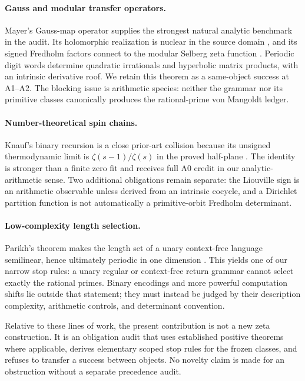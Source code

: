 \paragraph{Gauss and modular transfer operators.}
Mayer's Gauss-map operator supplies the strongest natural analytic benchmark
in the audit.  Its holomorphic realization is nuclear in the source domain
\citep{mayer1990gauss}, and its signed Fredholm factors connect to the modular
Selberg zeta function \citep{mayer1991selberg}.  Periodic digit words determine
quadratic irrationals and hyperbolic matrix products, with an intrinsic
derivative roof.  We retain this theorem as a same-object success at A1--A2.
The blocking issue is arithmetic species: neither the grammar nor its
primitive classes canonically produces the rational-prime von Mangoldt ledger.

\paragraph{Number-theoretical spin chains.}
Knauf's binary recursion is a close prior-art collision because its unsigned
thermodynamic limit is
\(\zeta(s-1)/\zeta(s)\) in the proved half-plane
\citep{knauf2013adelic,knauf1998spin,knauf1999erratum}.  The identity is stronger than a
finite zero fit and receives full A0 credit in our analytic-arithmetic sense.
Two additional obligations remain separate: the Liouville sign is an
arithmetic observable unless derived from an intrinsic cocycle, and a
Dirichlet partition function is not automatically a primitive-orbit Fredholm
determinant.

\paragraph{Low-complexity length selection.}
Parikh's theorem makes the length set of a unary context-free language
semilinear, hence ultimately periodic in one dimension
\citep{esparza2011parikh}.  This yields one of our narrow stop rules: a unary
regular or context-free return grammar cannot select exactly the rational
primes.  Binary encodings and more powerful computation shifts lie outside
that statement; they must instead be judged by their description complexity,
arithmetic controls, and determinant convention.

Relative to these lines of work, the present contribution is not a new zeta
construction.  It is an obligation audit that uses established positive
theorems where applicable, derives elementary scoped stop rules for the frozen
classes, and refuses to transfer a success between objects.  No novelty claim
is made for an obstruction without a separate precedence audit.
